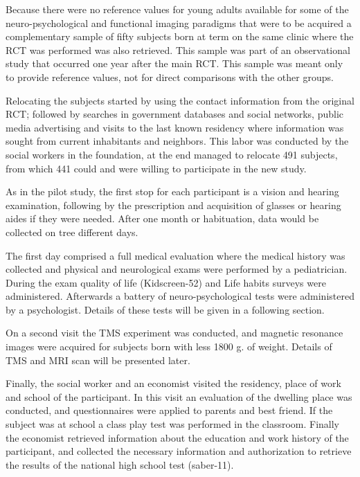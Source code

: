 Because there were no reference values for young adults available for some of the neuro-psychological and functional imaging paradigms that were to be acquired a complementary sample of fifty subjects born at term on the same clinic where the RCT was performed was also retrieved. This sample was part of an observational study that occurred one year after the main RCT. This sample was meant only to provide reference values, not for direct comparisons with the other groups.

Relocating the subjects started by using the contact information from the original RCT; followed by searches in government databases and social networks, public media advertising and visits to the last known residency where information was sought from current inhabitants and neighbors. This labor was conducted by the social workers in the foundation, at the end managed to relocate 491 subjects, from which 441 could and were willing to participate in the new study. 


 
As in the pilot study, the first stop for each participant is a vision and hearing examination, following by the prescription and acquisition of glasses or hearing aides if they were needed. After one month or habituation, data would be collected on tree different days.

The first day comprised a full medical evaluation where the medical history was collected and physical and neurological exams were performed by a pediatrician. During the exam quality of life (Kidscreen-52) and Life habits surveys were administered. Afterwards a battery of neuro-psychological tests were administered by a psychologist. Details of these tests will be given in a following section. 

On a second visit the TMS experiment was conducted, and magnetic resonance images were acquired for subjects born with less 1800 g. of weight. Details of TMS and MRI scan will be presented later.

Finally, the social worker and an economist visited the residency, place of work and school of the participant. In this visit an evaluation of the dwelling place was conducted, and questionnaires were applied to parents and best friend. If the subject was at school a class play test was performed in the classroom. Finally the economist retrieved information about the education and work history of the participant, and collected the necessary information and authorization to retrieve the results of the national high school test (saber-11).

